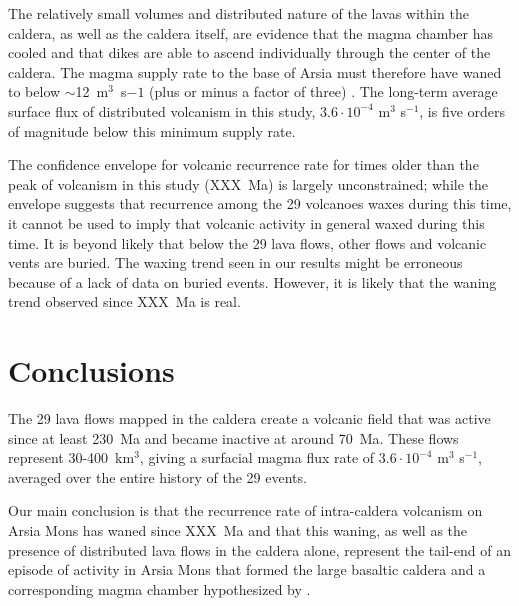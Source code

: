 \documentclass[12pt,letter]{article}
\begin{document}
The relatively small volumes and distributed nature of the lavas within the caldera, as well as the caldera itself, are evidence that the magma chamber has cooled and that dikes are able to ascend individually through the center of the caldera. The magma supply rate to the base of Arsia must therefore have waned to below $\sim$12~m$^3$~s$-1$ (plus or minus a factor of three) \citep{wilson2001evidence}. The long-term average surface flux of distributed volcanism in this study, $3.6\cdot 10^{-4}$ m$^3$ s$^{-1}$, is five orders of magnitude below this minimum supply rate.

The confidence envelope for volcanic recurrence rate for times older than the peak of volcanism in this study (XXX~Ma) is largely unconstrained; while the envelope suggests that recurrence among the 29 volcanoes waxes during this time, it cannot be used to imply that volcanic activity in general waxed during this time. It is beyond likely that below the 29 lava flows, other flows and volcanic vents are buried. The waxing trend seen in our results might be erroneous because of a lack of data on buried events. However, it is likely that the waning trend observed since XXX~Ma is real.

\section{Conclusions}

The 29 lava flows mapped in the caldera create a volcanic field that was active since at least 230~Ma and became inactive at around 70~Ma. These flows represent 30-400~km$^3$, giving a surfacial magma flux rate of $3.6\cdot 10^{-4}$ m$^3$ s$^{-1}$, averaged over the entire history of the 29 events.

Our main conclusion is that the recurrence rate of intra-caldera volcanism on Arsia Mons has waned since XXX~Ma and that this waning, as well as the presence of distributed lava flows in the caldera alone, represent the tail-end of an episode of activity in Arsia Mons that formed the large basaltic caldera and a corresponding magma chamber hypothesized by \citet{wilson2001evidence}.









\end{document}
